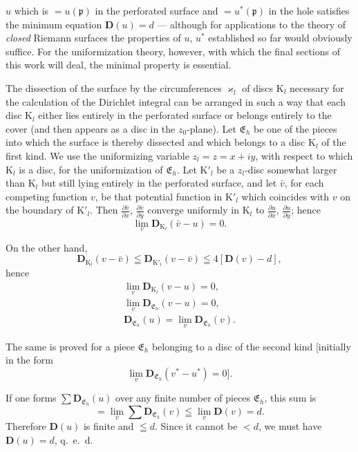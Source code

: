 \documentclass{article}
\begin{document}
$u$ which is $= u(\mathfrak{p})$ in the perforated surface and $= u^*(\mathfrak{p})$ in the hole satisfies the minimum equation $\mathbf{D}(u) = d$ --- although for applications to the theory of \emph{closed} Riemann surfaces the properties of $u$, $u^*$ established so far would obviously suffice. For the uniformization theory, however, with which the final sections of this work will deal, the minimal property is essential.

The dissection of the surface by the circumferences $\varkappa_l$ of discs $\mathrm{K}_l$ necessary for the calculation of the Dirichlet integral can be arranged in such a way that each disc $\mathrm{K}_l$ either lies entirely in the perforated surface or belongs entirely to the cover (and then appears as a disc in the $z_0$-plane). Let $\mathfrak{E}_h$ be one of the pieces into which the surface is thereby dissected and which belongs to a disc $\mathrm{K}_l$ of the first kind. We use the uniformizing variable $z_l = z = x + iy$, with respect to which $\mathrm{K}_l$ is a disc, for the uniformization of $\mathfrak{E}_h$. Let $\mathrm{K}'_l$ be a $z_l$-disc somewhat larger than $\mathrm{K}_l$ but still lying entirely in the perforated surface, and let $\bar{v}$, for each competing function $v$, be that potential function in $\mathrm{K}'_l$ which coincides with $v$ on the boundary of $\mathrm{K}'_l$. Then $\frac{\partial\bar{v}}{\partial x}$, $\frac{\partial\bar{v}}{\partial y}$ converge uniformly in $\mathrm{K}_l$ to $\frac{\partial u}{\partial x}$, $\frac{\partial u}{\partial y}$; hence
\[ \lim_v \mathbf{D}_{\mathrm{K}_l}(\bar{v} - u) = 0. \]

On the other hand,
\[ \mathbf{D}_{\mathrm{K}_l}(v - \bar{v}) \leqq \mathbf{D}_{\mathrm{K}'_l}(v - \bar{v}) \leqq 4[\mathbf{D}(v) - d], \]
hence
\[ \begin{gathered}
\lim_v \mathbf{D}_{\mathrm{K}_l}(v - u) = 0, \\
\lim_v \mathbf{D}_{\mathfrak{E}_h}(v - u) = 0, \\
\mathbf{D}_{\mathfrak{E}_h}(u) = \lim_v \mathbf{D}_{\mathfrak{E}_h}(v).
\end{gathered} \]

The same is proved for a piece $\mathfrak{E}_h$ belonging to a disc of the second kind [initially in the form
\[ \lim_v \mathbf{D}_{\mathfrak{E}_h}(v^* - u^*) = 0]. \]

If one forms $\displaystyle\sum\mathbf{D}_{\mathfrak{E}_h}(u)$ over any finite number of pieces $\mathfrak{E}_h$, this sum is
\[ = \lim_v \sum\mathbf{D}_{\mathfrak{E}_h}(v) \leqq \lim_v \mathbf{D}(v) = d. \]
Therefore $\mathbf{D}(u)$ is finite and $\leqq d$. Since it cannot be $< d$, we must have $\mathbf{D}(u) = d$, q.~e.~d.
\end{document}
